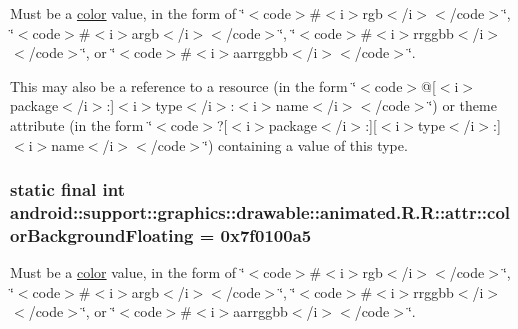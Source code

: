 Must be a \hyperlink{classandroid_1_1support_1_1graphics_1_1drawable_1_1animated_1_1_r_1_1color}{color} value, in the form of \char`\"{}$<$code$>$\#$<$i$>$rgb$<$/i$>$$<$/code$>$\char`\"{}, \char`\"{}$<$code$>$\#$<$i$>$argb$<$/i$>$$<$/code$>$\char`\"{}, \char`\"{}$<$code$>$\#$<$i$>$rrggbb$<$/i$>$$<$/code$>$\char`\"{}, or \char`\"{}$<$code$>$\#$<$i$>$aarrggbb$<$/i$>$$<$/code$>$\char`\"{}. 

This may also be a reference to a resource (in the form \char`\"{}$<$code$>$@\mbox{[}$<$i$>$package$<$/i$>$:\mbox{]}$<$i$>$type$<$/i$>$:$<$i$>$name$<$/i$>$$<$/code$>$\char`\"{}) or theme attribute (in the form \char`\"{}$<$code$>$?\mbox{[}$<$i$>$package$<$/i$>$:\mbox{]}\mbox{[}$<$i$>$type$<$/i$>$:\mbox{]}$<$i$>$name$<$/i$>$$<$/code$>$\char`\"{}) containing a value of this type. \hypertarget{classandroid_1_1support_1_1graphics_1_1drawable_1_1animated_1_1_r_1_1attr_1a7a780b1a00914e33a729f0c0647fc9}{
\subsubsection[{colorBackgroundFloating}]{\setlength{\rightskip}{0pt plus 5cm}static final int android::support::graphics::drawable::animated.R.R::attr::colorBackgroundFloating = 0x7f0100a5}}
\label{classandroid_1_1support_1_1graphics_1_1drawable_1_1animated_1_1_r_1_1attr_1a7a780b1a00914e33a729f0c0647fc9}


Must be a \hyperlink{classandroid_1_1support_1_1graphics_1_1drawable_1_1animated_1_1_r_1_1color}{color} value, in the form of \char`\"{}$<$code$>$\#$<$i$>$rgb$<$/i$>$$<$/code$>$\char`\"{}, \char`\"{}$<$code$>$\#$<$i$>$argb$<$/i$>$$<$/code$>$\char`\"{}, \char`\"{}$<$code$>$\#$<$i$>$rrggbb$<$/i$>$$<$/code$>$\char`\"{}, or \char`\"{}$<$code$>$\#$<$i$>$aarrggbb$<$/i$>$$<$/code$>$\char`\"{}. 

